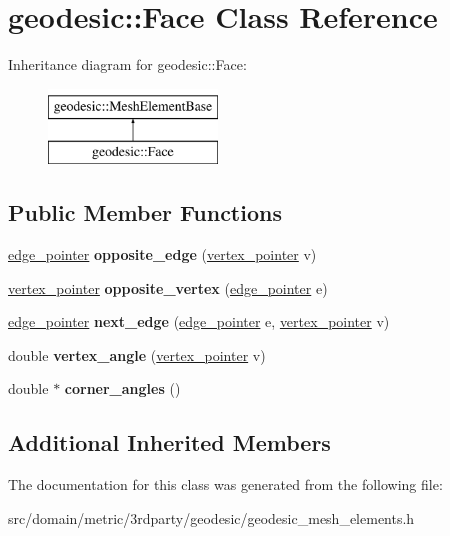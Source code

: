 \hypertarget{classgeodesic_1_1_face}{}\section{geodesic\+:\+:Face Class Reference}
\label{classgeodesic_1_1_face}
Inheritance diagram for geodesic\+:\+:Face\+:\begin{figure}[H]
\begin{center}
\leavevmode
\includegraphics[height=2.000000cm]{classgeodesic_1_1_face}
\end{center}
\end{figure}
\subsection*{Public Member Functions}
\begin{DoxyCompactItemize}
\item 
\hypertarget{classgeodesic_1_1_face_a53b7a1245ad6ae15b074795e842b29f8}{}\hyperlink{classgeodesic_1_1_edge}{edge\+\_\+pointer} {\bfseries opposite\+\_\+edge} (\hyperlink{classgeodesic_1_1_vertex}{vertex\+\_\+pointer} v)\label{classgeodesic_1_1_face_a53b7a1245ad6ae15b074795e842b29f8}

\item 
\hypertarget{classgeodesic_1_1_face_a1019346a7b365a584bba05df2e8007b8}{}\hyperlink{classgeodesic_1_1_vertex}{vertex\+\_\+pointer} {\bfseries opposite\+\_\+vertex} (\hyperlink{classgeodesic_1_1_edge}{edge\+\_\+pointer} e)\label{classgeodesic_1_1_face_a1019346a7b365a584bba05df2e8007b8}

\item 
\hypertarget{classgeodesic_1_1_face_a55006ee598a9a1a379607b45f3195e89}{}\hyperlink{classgeodesic_1_1_edge}{edge\+\_\+pointer} {\bfseries next\+\_\+edge} (\hyperlink{classgeodesic_1_1_edge}{edge\+\_\+pointer} e, \hyperlink{classgeodesic_1_1_vertex}{vertex\+\_\+pointer} v)\label{classgeodesic_1_1_face_a55006ee598a9a1a379607b45f3195e89}

\item 
\hypertarget{classgeodesic_1_1_face_ad4aaaff39977cc3ef9774d65b2833821}{}double {\bfseries vertex\+\_\+angle} (\hyperlink{classgeodesic_1_1_vertex}{vertex\+\_\+pointer} v)\label{classgeodesic_1_1_face_ad4aaaff39977cc3ef9774d65b2833821}

\item 
\hypertarget{classgeodesic_1_1_face_a3c73256fa53edb4f8f285db219dc97bd}{}double $\ast$ {\bfseries corner\+\_\+angles} ()\label{classgeodesic_1_1_face_a3c73256fa53edb4f8f285db219dc97bd}

\end{DoxyCompactItemize}
\subsection*{Additional Inherited Members}


The documentation for this class was generated from the following file\+:\begin{DoxyCompactItemize}
\item 
src/domain/metric/3rdparty/geodesic/geodesic\+\_\+mesh\+\_\+elements.\+h\end{DoxyCompactItemize}
